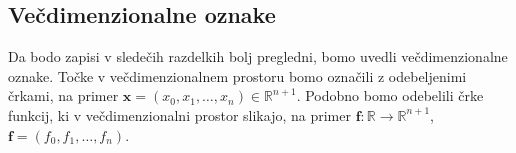 \documentclass[isrm2, tisk]{fmfdelo}
\newcommand{\R}{\mathbb R}
\begin{document}
    \subsection{Večdimenzionalne oznake}
    Da bodo zapisi v sledečih razdelkih bolj pregledni, bomo uvedli večdimenzionalne oznake.
    Točke v večdimenzionalnem prostoru bomo označili z odebeljenimi črkami, na primer $\mathbf{x}=(x_0,x_1,\dots,x_n)\in\R^{n+1}$.
    Podobno bomo odebelili črke funkcij, ki v večdimenzionalni prostor slikajo, na primer $\mathbf{f}:\R\to\R^{n+1}$, $\mathbf{f}=\left( f_0,f_1,\dots,f_n\right)$.
\end{document}
